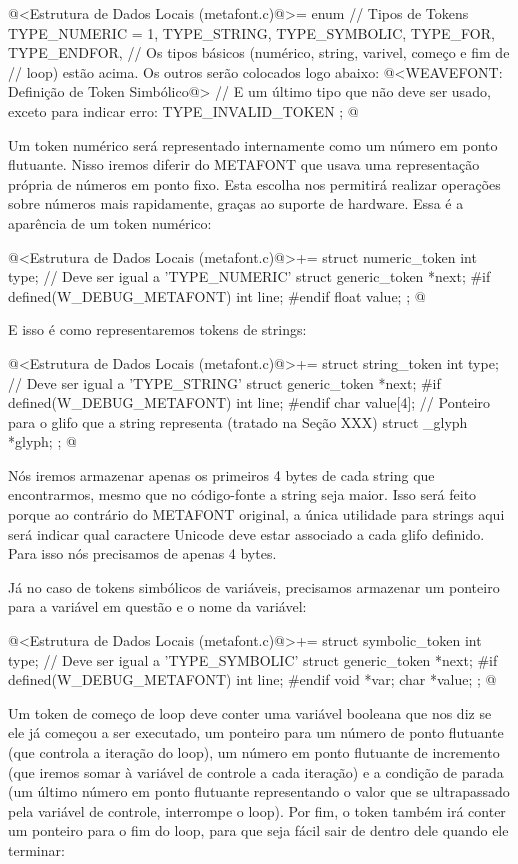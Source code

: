 \iniciocodigo
@<Estrutura de Dados Locais (metafont.c)@>=
enum { // Tipos de Tokens
  TYPE_NUMERIC = 1, TYPE_STRING, TYPE_SYMBOLIC, TYPE_FOR, TYPE_ENDFOR,
  // Os tipos básicos (numérico, string, varivel, começo e fim de
  // loop) estão acima. Os outros serão colocados logo abaixo:
  @<WEAVEFONT: Definição de Token Simbólico@>
  // E um último tipo que não deve ser usado, exceto para indicar erro:
  TYPE_INVALID_TOKEN
};
@
\fimcodigo

Um token numérico será representado internamente como um número em
ponto flutuante. Nisso iremos diferir do METAFONT que usava uma
representação própria de números em ponto fixo. Esta escolha nos
permitirá realizar operações sobre números mais rapidamente, graças ao
suporte de hardware.  Essa é a aparência de um token numérico:

\iniciocodigo
@<Estrutura de Dados Locais (metafont.c)@>+=
struct numeric_token{
  int type;   // Deve ser igual a 'TYPE_NUMERIC'
  struct generic_token *next;
#if defined(W_DEBUG_METAFONT)
  int line;
#endif
  float value;
};
@
\fimcodigo

E isso é como representaremos tokens de strings:

\iniciocodigo
@<Estrutura de Dados Locais (metafont.c)@>+=
struct string_token{
  int type;   // Deve ser igual a 'TYPE_STRING'
  struct generic_token *next;
#if defined(W_DEBUG_METAFONT)
  int line;
#endif
  char value[4];
  // Ponteiro para o glifo que a string representa (tratado na Seção XXX)
  struct _glyph *glyph;
};
@
\fimcodigo

Nós iremos armazenar apenas os primeiros 4 bytes de cada string que
encontrarmos, mesmo que no código-fonte a string seja maior. Isso será
feito porque ao contrário do METAFONT original, a única utilidade para
strings aqui será indicar qual caractere Unicode deve estar associado
a cada glifo definido. Para isso nós precisamos de apenas 4 bytes.

Já no caso de tokens simbólicos de variáveis, precisamos armazenar um
ponteiro para a variável em questão e o nome da variável:

\iniciocodigo
@<Estrutura de Dados Locais (metafont.c)@>+=
struct symbolic_token{
  int type;   // Deve ser igual a 'TYPE_SYMBOLIC'
  struct generic_token *next;
#if defined(W_DEBUG_METAFONT)
  int line;
#endif
  void *var;
  char *value;
};
@
\fimcodigo

Um token de começo de loop deve conter uma variável booleana que nos
diz se ele já começou a ser executado, um ponteiro para um número de
ponto flutuante (que controla a iteração do loop), um número em ponto
flutuante de incremento (que iremos somar à variável de controle a
cada iteração) e a condição de parada (um último número em ponto
flutuante representando o valor que se ultrapassado pela variável de
controle, interrompe o loop). Por fim, o token também irá conter um
ponteiro para o fim do loop, para que seja fácil sair de dentro dele
quando ele terminar:

